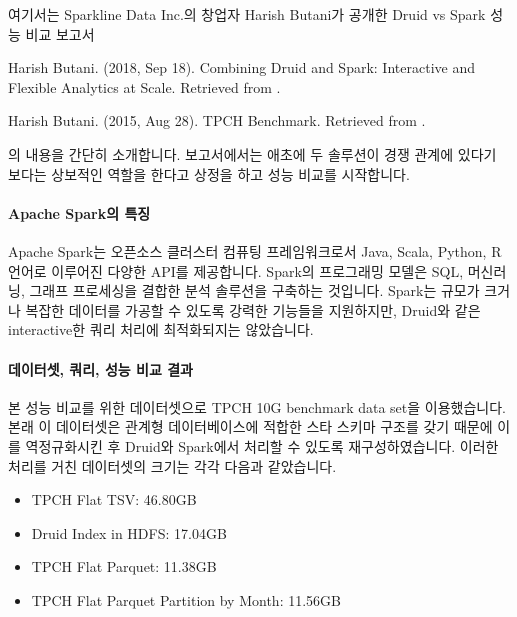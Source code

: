 \documentclass[letterpaper,10pt,english]{sphinxmanual}
\begin{document}
여기서는 Sparkline Data Inc.의 창업자 Harish Butani가 공개한 Druid vs Spark 성능 비교 보고서%
\begin{footnote}[4]\sphinxAtStartFootnote
Harish Butani. (2018, Sep 18). Combining Druid and Spark: Interactive and Flexible Analytics at Scale. Retrieved from .
%
\end{footnote}%
\begin{footnote}[5]\sphinxAtStartFootnote
Harish Butani. (2015, Aug 28). TPCH Benchmark. Retrieved from .
%
\end{footnote}의 내용을 간단히 소개합니다. 보고서에서는 애초에 두 솔루션이 경쟁 관계에 있다기 보다는 상보적인 역할을 한다고 상정을 하고 성능 비교를 시작합니다.


\paragraph{Apache Spark의 특징}
\label{\detokenize{discovery/part01/druid_tests:id9}}
Apache Spark는 오픈소스 클러스터 컴퓨팅 프레임워크로서 Java, Scala, Python, R 언어로 이루어진 다양한 API를 제공합니다. Spark의 프로그래밍 모델은 SQL, 머신러닝, 그래프 프로세싱을 결합한 분석 솔루션을 구축하는 것입니다. Spark는 규모가 크거나 복잡한 데이터를 가공할 수 있도록 강력한 기능들을 지원하지만, Druid와 같은 interactive한 쿼리 처리에 최적화되지는 않았습니다.


\paragraph{데이터셋, 쿼리, 성능 비교 결과}
\label{\detokenize{discovery/part01/druid_tests:id10}}
본 성능 비교를 위한 데이터셋으로 TPCH 10G benchmark data set을 이용했습니다. 본래 이 데이터셋은 관계형 데이터베이스에 적합한 스타 스키마 구조를 갖기 때문에 이를 역정규화시킨 후 Druid와 Spark에서 처리할 수 있도록 재구성하였습니다. 이러한 처리를 거친 데이터셋의 크기는 각각 다음과 같았습니다.
\begin{itemize}
\item {} 
TPCH Flat TSV: 46.80GB

\item {} 
Druid Index in HDFS: 17.04GB

\item {} 
TPCH Flat Parquet: 11.38GB

\item {} 
TPCH Flat Parquet Partition by Month: 11.56GB

\end{itemize}
\end{document}
